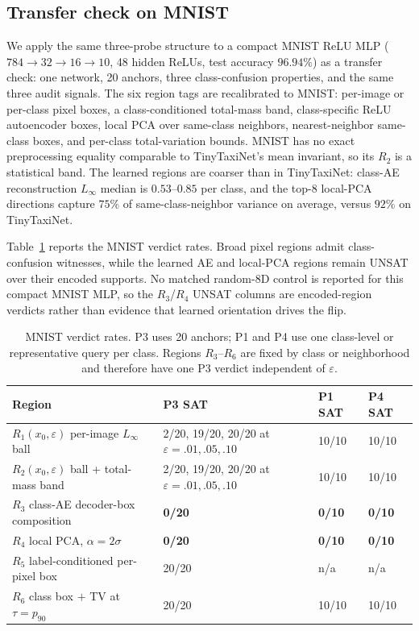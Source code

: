 \documentclass[twocolumn,smallextended,runningheads]{svjour3}
\newcommand{\sttttablefont}{\footnotesize}
\begin{document}
\subsection{Transfer check on MNIST}
\label{sec:probe_mnist}
\label{sec:mnist}

We apply the same three-probe structure to a compact MNIST ReLU MLP ($784 \to 32 \to 16 \to 10$, 48 hidden ReLUs, test accuracy $96.94\%$) as a transfer check: one network, 20 anchors, three class-confusion properties, and the same three audit signals. The six region tags are recalibrated to MNIST: per-image or per-class pixel boxes, a class-conditioned total-mass band, class-specific ReLU autoencoder boxes, local PCA over same-class neighbors, nearest-neighbor same-class boxes, and per-class total-variation bounds. MNIST has no exact preprocessing equality comparable to TinyTaxiNet's mean invariant, so its $R_2$ is a statistical band. The learned regions are coarser than in TinyTaxiNet: class-AE reconstruction $L_\infty$ median is $0.53$--$0.85$ per class, and the top-8 local-PCA directions capture $75\%$ of same-class-neighbor variance on average, versus $92\%$ on TinyTaxiNet.

Table~\ref{tab:mnist_verdicts} reports the MNIST verdict rates. Broad pixel regions admit class-confusion witnesses, while the learned AE and local-PCA regions remain UNSAT over their encoded supports. No matched random-8D control is reported for this compact MNIST MLP, so the $R_3$/$R_4$ UNSAT columns are encoded-region verdicts rather than evidence that learned orientation drives the flip.

\begin{table}[htbp]
\centering
\sttttablefont
\setlength{\tabcolsep}{4pt}
\begin{tabular}{p{}p{}p{}p{}}
\toprule
Region & P3 SAT & P1 SAT & P4 SAT \\
\midrule
$R_1(x_0,\varepsilon)$ per-image $L_\infty$ ball & 2/20, 19/20, 20/20 at $\varepsilon=.01,.05,.10$ & 10/10 & 10/10 \\
$R_2(x_0,\varepsilon)$ ball + total-mass band & 2/20, 19/20, 20/20 at $\varepsilon=.01,.05,.10$ & 10/10 & 10/10 \\
$R_3$ class-AE decoder-box composition & \textbf{0/20} & \textbf{0/10} & \textbf{0/10} \\
$R_4$ local PCA, $\alpha = 2\sigma$ & \textbf{0/20} & \textbf{0/10} & \textbf{0/10} \\
$R_5$ label-conditioned per-pixel box & 20/20 & n/a & n/a \\
$R_6$ class box $+$ TV at $\tau = p_{90}$ & 20/20 & 10/10 & 10/10 \\
\bottomrule
\end{tabular}
\caption{MNIST verdict rates. P3 uses 20 anchors; P1 and P4 use one class-level or representative query per class. Regions $R_3$--$R_6$ are fixed by class or neighborhood and therefore have one P3 verdict independent of $\varepsilon$.}
\label{tab:mnist_verdicts}
\end{table}
\end{document}
